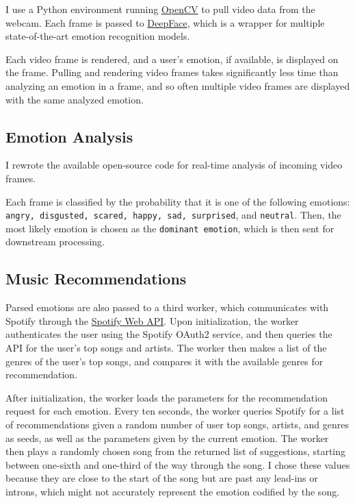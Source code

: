 \documentclass{article}
\renewcommand{\_}[1]{\underline{ #1 }}
\theoremstyle{definition}
\begin{document}
I use a Python environment running \href{https://pypi.org/project/opencv-python/}{OpenCV} to pull video data from the webcam. Each frame is passed to \href{https://pypi.org/project/deepface/}{DeepFace}, which is a wrapper for multiple state-of-the-art emotion recognition models.

Each video frame is rendered, and a user's emotion, if available, is displayed on the frame. Pulling and rendering video frames takes significantly less time than analyzing an emotion in a frame, and so often multiple video frames are displayed with the same analyzed emotion.

\subsection[Emotion Analysis]{Emotion Analysis}

I rewrote the available open-source code for real-time analysis of incoming video frames. 

Each frame is classified by the probability that it is one of the following emotions: \texttt{angry, disgusted, scared, happy, sad, surprised}, and \texttt{neutral}. Then, the most likely emotion is chosen as the \texttt{dominant emotion}, which is then sent for downstream processing.

\subsection[Music Recommendations]{Music Recommendations}

Parsed emotions are also passed to a third worker, which communicates with Spotify through the \href{https://developer.spotify.com/documentation/web-api/}{Spotify Web API}. Upon initialization, the worker authenticates the user using the Spotify OAuth2 service, and then queries the API for the user's top songs and artists. The worker then makes a list of the genres of the user's top songs, and compares it with the available genres for recommendation.

After initialization, the worker loads the parameters for the recommendation request for each emotion. Every ten seconds, the worker queries Spotify for a list of recommendations given a random number of user top songs, artists, and genres as seeds, as well as the parameters given by the current emotion. The worker then plays a randomly chosen song from the returned list of suggestions, starting between one-sixth and one-third of the way through the song. I chose these values because they are close to the start of the song but are past any lead-ins or introns, which might not accurately represent the emotion codified by the song.
\end{document}
